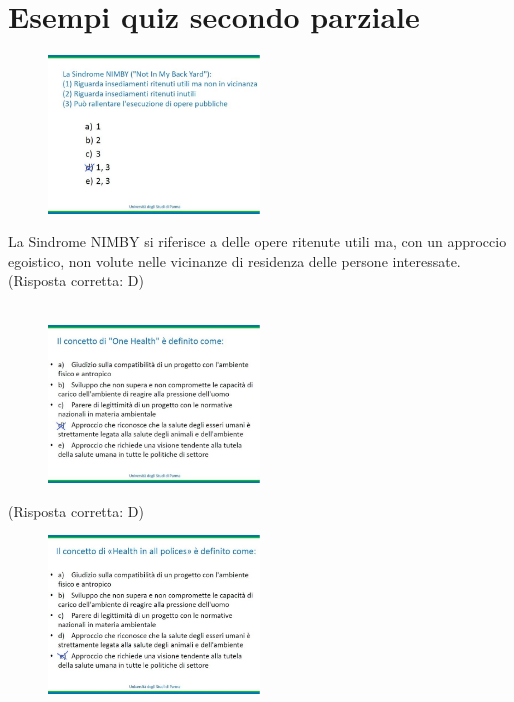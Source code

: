 \section{Esempi quiz secondo parziale}

\begin{figure}[!ht]
\centering
	\includegraphics[width=0.5\textwidth]{25/image1.jpeg}
	\end{figure}

La Sindrome NIMBY si riferisce a delle opere ritenute utili ma, con un
approccio egoistico, non volute nelle vicinanze di residenza delle
persone interessate. (Risposta corretta: D)
\\\\
\begin{figure}[!ht]
\centering
	\includegraphics[width=0.5\textwidth]{25/image2.jpeg}
	\end{figure}

(Risposta corretta: D)

\begin{figure}[!ht]
\centering
	\includegraphics[width=0.5\textwidth]{25/image3.jpeg}
	\end{figure}

